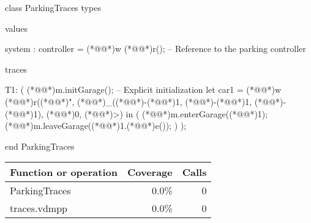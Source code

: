 \documentclass[a4paper]{article}
\begin{document}
\title{}
\author{}
\begin{vdm_al}
class ParkingTraces
types

values

    system : controller = (*@@*)w (*@@*)r();  -- Reference to the parking controller
    

traces

T1:
(
    (*@@*)m.initGarage();
     -- Explicit initialization
    let car1 = (*@@*)w (*@@*)r((*@@*)", (*@@*)_((*@\vdmnotcovered{}@*)-(*@\vdmnotcovered{}@*)1, (*@\vdmnotcovered{}@*)-(*@\vdmnotcovered{}@*)1, (*@\vdmnotcovered{}@*)-(*@\vdmnotcovered{}@*)1), (*@\vdmnotcovered{}@*)0, (*@@*)>) in
    (
        (*@@*)m.enterGarage((*@@*)1);
        (*@@*)m.leaveGarage((*@@*)1.(*@@*)e());
    )
);







end ParkingTraces
\end{vdm_al}
\bigskip
\begin{longtable}{|l|r|r|}
\hline
Function or operation & Coverage & Calls \\
\hline
\hline
ParkingTraces & 0.0\% & 0 \\
\hline
\hline
traces.vdmpp & 0.0\% & 0 \\
\hline
\end{longtable}
\end{document}
